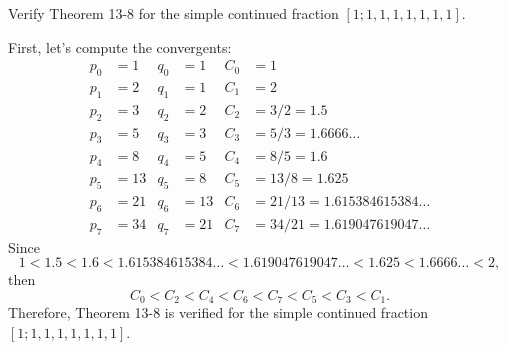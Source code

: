 \begin{exercise}
    Verify Theorem 13-8 for the simple continued fraction $[1; 1, 1, 1, 1, 1, 1, 1]$. \\
\end{exercise}

\begin{solution}
    First, let's compute the convergents:
    \begin{align*}
        p_0 &= 1 & q_0 &= 1 & C_0 &= 1 \\
        p_1 &= 2 & q_1 &= 1 & C_1 &= 2 \\
        p_2 &= 3 & q_2 &= 2 & C_2 &= 3/2 = 1.5 \\
        p_3 &= 5 & q_3 &= 3 & C_3 &= 5/3 = 1.6666\dots \\
        p_4 &= 8 & q_4 &= 5 & C_4 &= 8/5 = 1.6 \\
        p_5 &= 13 & q_5 &= 8 & C_5 &= 13/8 = 1.625 \\
        p_6 &= 21 & q_6 &= 13 & C_6 &= 21/13 = 1.615384615384\dots \\
        p_7 &= 34 & q_7 &= 21 & C_7 &= 34/21 = 1.619047619047\dots
    \end{align*}
    Since
    $$1 < 1.5 < 1.6 < 1.615384615384\dots < 1.619047619047\dots < 1.625 < 1.6666\dots < 2,$$
    then
    $$C_0 < C_2 < C_4 < C_6 < C_7 < C_5 < C_3 < C_1.$$
    Therefore, Theorem 13-8 is verified for the simple continued fraction $[1; 1, 1, 1, 1, 1, 1, 1]$.
\end{solution}